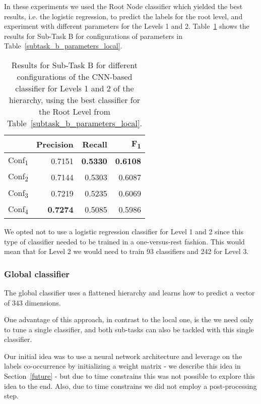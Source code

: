 \documentclass[11pt,a4paper]{article}
\begin{document}
In these experiments we used the Root Node classifier which yielded the best
results, i.e. the logistic regression, to predict the labels for the root level,
and experiment with different parameters for the Levels 1 and 2.
Table~\ref{level-1-2} shows the results for Sub-Task B for configurations of
parameters in Table~\ref{subtask_b_parameters_local}.

\begin{table}[!h]
\begin{center}
\begin{tabular}{|l|r|r|r|}
\hline\centering\textbf{}  & \textbf{Precision} &  \textbf{Recall} &  \textbf{F\textsubscript{1}}\\
\hline
Conf\textsubscript{1} & 0.7151 & \textbf{0.5330} & \textbf{0.6108} \\
Conf\textsubscript{2} & 0.7144 & 0.5303 & 0.6087 \\
Conf\textsubscript{3} & 0.7219 & 0.5235 & 0.6069 \\
Conf\textsubscript{4} & \textbf{0.7274} & 0.5085 & 0.5986 \\
\hline
\end{tabular}
\end{center}
\caption{\label{level-1-2} Results for Sub-Task B for different configurations
of the CNN-based classifier for Levels 1 and 2 of the hierarchy, using the best
classifier for the Root Level from Table~\ref{subtask_b_parameters_local}.}
\end{table}

We opted not to use a logistic regression classifier for Level 1 and 2 since
this type of classifier needed to be trained in a one-versus-rest fashion.
This would mean that for Level 2 we would need to train 93 classifiers and 242
for Level 3.

\subsubsection{Global classifier}

The global classifier uses a flattened hierarchy and learns how to predict a
vector of 343 dimensions.

One advantage of this approach, in contrast to the local one, is the we need only
to tune a single classifier, and both sub-tasks can also be tackled with this
single classifier.

Our initial idea was to use a neural network architecture and leverage on the
labels co-occurrence by initializing a weight matrix - we describe this idea in
Section~\ref{future} - but due to time constrains this was not possible to
explore this idea to the end. Also, due to time constrains we did not employ
a post-processing step.
\end{document}
